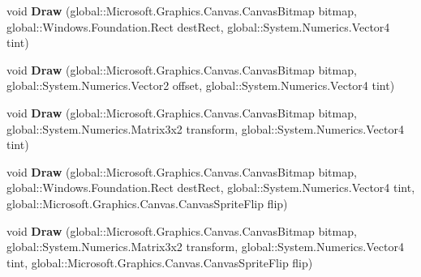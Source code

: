 \begin{DoxyCompactItemize}
\item 
\mbox{\label{class_microsoft_1_1_graphics_1_1_canvas_1_1_canvas_sprite_batch_ac6a57c21e98d51e115cc80bfc708824f}} 
void {\bfseries Draw} (global\+::\+Microsoft.\+Graphics.\+Canvas.\+Canvas\+Bitmap bitmap, global\+::\+Windows.\+Foundation.\+Rect dest\+Rect, global\+::\+System.\+Numerics.\+Vector4 tint)
\item 
\mbox{\label{class_microsoft_1_1_graphics_1_1_canvas_1_1_canvas_sprite_batch_af83f6d164806efe2c3b5584aacf35266}} 
void {\bfseries Draw} (global\+::\+Microsoft.\+Graphics.\+Canvas.\+Canvas\+Bitmap bitmap, global\+::\+System.\+Numerics.\+Vector2 offset, global\+::\+System.\+Numerics.\+Vector4 tint)
\item 
\mbox{\label{class_microsoft_1_1_graphics_1_1_canvas_1_1_canvas_sprite_batch_a37f363ad9485bacdf1870d5fcac66390}} 
void {\bfseries Draw} (global\+::\+Microsoft.\+Graphics.\+Canvas.\+Canvas\+Bitmap bitmap, global\+::\+System.\+Numerics.\+Matrix3x2 transform, global\+::\+System.\+Numerics.\+Vector4 tint)
\item 
\mbox{\label{class_microsoft_1_1_graphics_1_1_canvas_1_1_canvas_sprite_batch_a539c34e4dd073937d6e282aff3ac5fa3}} 
void {\bfseries Draw} (global\+::\+Microsoft.\+Graphics.\+Canvas.\+Canvas\+Bitmap bitmap, global\+::\+Windows.\+Foundation.\+Rect dest\+Rect, global\+::\+System.\+Numerics.\+Vector4 tint, global\+::\+Microsoft.\+Graphics.\+Canvas.\+Canvas\+Sprite\+Flip flip)
\item 
\mbox{\label{class_microsoft_1_1_graphics_1_1_canvas_1_1_canvas_sprite_batch_a6ce7fa9de20ecdd859df4d33baa22b96}} 
void {\bfseries Draw} (global\+::\+Microsoft.\+Graphics.\+Canvas.\+Canvas\+Bitmap bitmap, global\+::\+System.\+Numerics.\+Matrix3x2 transform, global\+::\+System.\+Numerics.\+Vector4 tint, global\+::\+Microsoft.\+Graphics.\+Canvas.\+Canvas\+Sprite\+Flip flip)
\item 
\mbox{\label{class_microsoft_1_1_graphics_1_1_canvas_1_1_canvas_sprite_batch_ad594e0d83883455fdc71585e3b4b4b46}} 

\end{DoxyCompactItemize}
